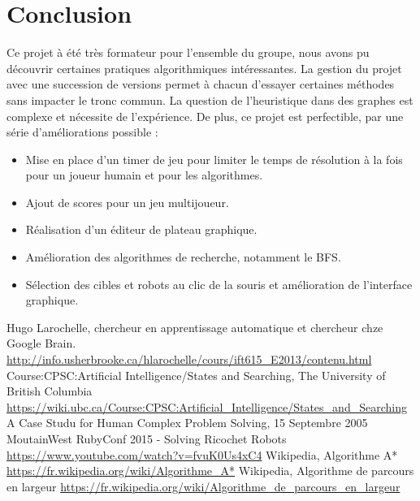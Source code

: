 \documentclass[a4paper]{article} %
\begin{document}
\section{Conclusion}
Ce projet à été très formateur pour l'ensemble du groupe, nous avons pu découvrir certaines pratiques algorithmiques intéressantes. La gestion du projet avec une succession de versions permet à chacun d'essayer certaines méthodes sans impacter le tronc commun. La question de l'heuristique dans des graphes est complexe et nécessite de l'expérience. De plus, ce projet est perfectible, par une série d'améliorations possible :
\begin{itemize}
\item Mise en place d'un timer de jeu pour limiter le temps de résolution à la fois pour un joueur humain et pour les algorithmes.
\item Ajout de scores pour un jeu multijoueur.
\item Réalisation d'un éditeur de plateau graphique.
\item Amélioration des algorithmes de recherche, notamment le BFS.
\item Sélection des cibles et robots au clic de la souris et amélioration de l'interface graphique.
\end{itemize}

\begin{thebibliography}{9}
 Hugo Larochelle, chercheur en apprentissage automatique et chercheur chze Google Brain. \url{http://info.usherbrooke.ca/hlarochelle/cours/ift615_E2013/contenu.html}
 Course:CPSC:Artificial Intelligence/States and Searching, The University of British Columbia \url{https://wiki.ubc.ca/Course:CPSC:Artificial_Intelligence/States_and_Searching}
 A Case Studu for Human Complex Problem Solving, 15 Septembre 2005
 MoutainWest RubyConf 2015 - Solving Ricochet Robots \url{https://www.youtube.com/watch?v=fvuK0Us4xC4}
 Wikipedia, Algorithme A* \url{https://fr.wikipedia.org/wiki/Algorithme_A*}
 Wikipedia, Algorithme de parcours en largeur \url{https://fr.wikipedia.org/wiki/Algorithme_de_parcours_en_largeur}
\end{thebibliography}
\end{document}

